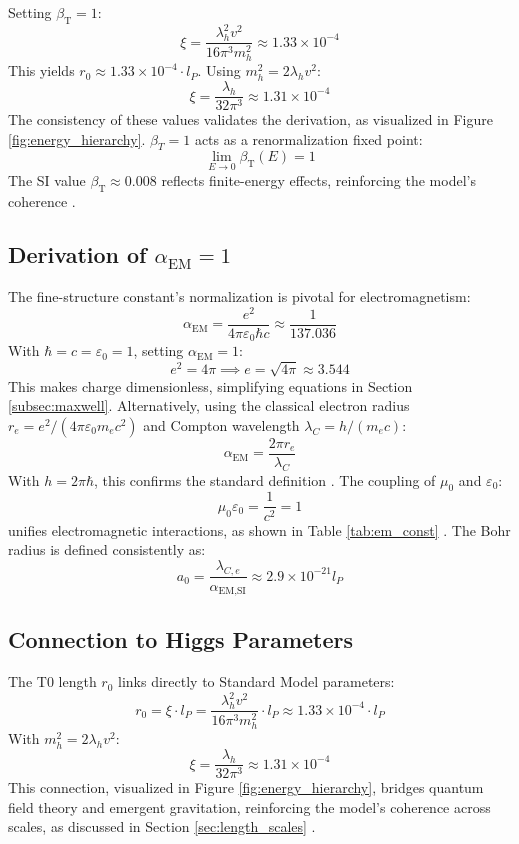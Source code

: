 \documentclass[12pt,a4paper]{article}
\newcommand{\alphaEM}{\alpha_{\text{EM}}}
\newcommand{\betaT}{\beta_{\text{T}}}
\begin{document}
	Setting \(\betaT = 1\):
	\[
	\xi = \frac{\lambda_h^2 v^2}{16 \pi^3 m_h^2} \approx 1.33 \times 10^{-4}
	\]
	This yields \(r_0 \approx 1.33 \times 10^{-4} \cdot l_P\). Using \(m_h^2 = 2 \lambda_h v^2\):
	\[
	\xi = \frac{\lambda_h}{32 \pi^3} \approx 1.31 \times 10^{-4}
	\]
	The consistency of these values validates the derivation, as visualized in Figure \ref{fig:energy_hierarchy}. \(\beta_T = 1\) acts as a renormalization fixed point:
	\[
	\lim_{E \to 0} \betaT(E) = 1
	\]
	The SI value \(\betaT \approx 0.008\) reflects finite-energy effects, reinforcing the model’s coherence \cite{pascher_beta_2025}.
	
	\subsection{Derivation of \(\alpha_{\text{EM}} = 1\)}
	\label{subsec:alpha_derivation}
	
	The fine-structure constant’s normalization is pivotal for electromagnetism:
	\[
	\alphaEM = \frac{e^2}{4 \pi \varepsilon_0 \hbar c} \approx \frac{1}{137.036}
	\]
	With \(\hbar = c = \varepsilon_0 = 1\), setting \(\alphaEM = 1\):
	\[
	e^2 = 4 \pi \implies e = \sqrt{4 \pi} \approx 3.544
	\]
	This makes charge dimensionless, simplifying equations in Section \ref{subsec:maxwell}. Alternatively, using the classical electron radius \(r_e = e^2/(4 \pi \varepsilon_0 m_e c^2)\) and Compton wavelength \(\lambda_C = h/(m_e c)\):
	\[
	\alphaEM = \frac{2 \pi r_e}{\lambda_C}
	\]
	With \(h = 2 \pi \hbar\), this confirms the standard definition \cite{pascher_alpha_2025}. The coupling of \(\mu_0\) and \(\varepsilon_0\):
	\[
	\mu_0 \varepsilon_0 = \frac{1}{c^2} = 1
	\]
	unifies electromagnetic interactions, as shown in Table \ref{tab:em_const} \cite{pascher_alphabeta_2025}. The Bohr radius is defined consistently as:
	\[
	a_0 = \frac{\lambda_{C,e}}{\alpha_{\text{EM,SI}}} \approx 2.9 \times 10^{-21} l_P
	\]
	
	\subsection{Connection to Higgs Parameters}
	\label{subsec:higgs}
	
	The T0 length \(r_0\) links directly to Standard Model parameters:
	\[
	r_0 = \xi \cdot l_P = \frac{\lambda_h^2 v^2}{16 \pi^3 m_h^2} \cdot l_P \approx 1.33 \times 10^{-4} \cdot l_P
	\]
	With \(m_h^2 = 2 \lambda_h v^2\):
	\[
	\xi = \frac{\lambda_h}{32 \pi^3} \approx 1.31 \times 10^{-4}
	\]
	This connection, visualized in Figure \ref{fig:energy_hierarchy}, bridges quantum field theory and emergent gravitation, reinforcing the model’s coherence across scales, as discussed in Section \ref{sec:length_scales} \cite{pascher_higgs_2025}.
	
\end{document}
